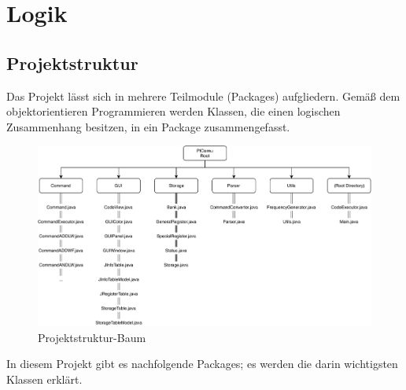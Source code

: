 \chapter{Logik}

\section{Projektstruktur}

Das Projekt lässt sich in mehrere Teilmodule (Packages) aufgliedern. Gemäß dem objektorientieren Programmieren werden Klassen, die einen logischen Zusammenhang besitzen, in ein Package zusammengefasst.

\begin{figure}[!ht]
\centering
\includegraphics[width=\textwidth]{img/PICsimu-tree.pdf}
\caption{Projektstruktur-Baum}
\label{project-tree}
\end{figure}

\noindent In diesem Projekt gibt es nachfolgende Packages; es werden die darin wichtigsten Klassen erklärt.


